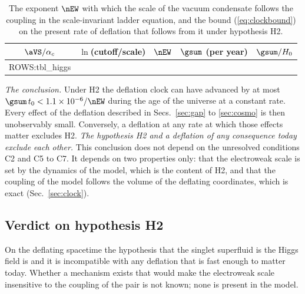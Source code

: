 \begin{table}
\caption{\label{tab:higgs}The exponent $\nEW$ with which the scale of the vacuum condensate follows
the coupling in the scale-invariant ladder equation, and the bound (\ref{eq:clockbound}) on the
present rate of deflation that follows from it under hypothesis H2.}
\begin{ruledtabular}
\begin{tabular}{ccccc}
$\aVS/\alpha_c$ & $\ln$(cutoff/scale) & $\nEW$ & $\gsum$ (per year) & $\gsum/H_0$ \\
\hline
{{ROWS:tbl_higgs}}
\end{tabular}
\end{ruledtabular}
\end{table}

\emph{The conclusion.} Under H2 the deflation clock can have advanced by at most
$\gsum\,t_0<1.1\times10^{-6}/\nEW$ during the age of the universe at a constant rate. Every effect of
the deflation described in Secs.~\ref{sec:gap} to \ref{sec:cosmo} is then unobservably small.
Conversely, a deflation at any rate at which those effects matter excludes H2. \emph{The hypothesis
H2 and a deflation of any consequence today exclude each other.} This conclusion does not depend on
the unresolved conditions C2 and C5 to C7. It depends on two properties only: that the electroweak
scale is set by the dynamics of the model, which is the content of H2, and that the coupling of the
model follows the volume of the deflating coordinates, which is exact (Sec.~\ref{sec:clock}).

\subsection{Verdict on hypothesis H2}

On the deflating spacetime the hypothesis that the singlet superfluid is the Higgs field is
 and it is incompatible with any deflation that is fast
enough to matter today. Whether a mechanism exists that would make the electroweak scale insensitive
to the coupling of the pair is not known; none is present in the model.

